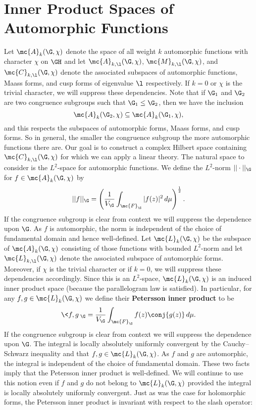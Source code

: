   \section{Inner Product Spaces of Automorphic Functions}
    Let $\mc{A}_{k}(\G,\chi)$ denote the space of all weight $k$ automorphic functions with character $\chi$ on $\GH$ and let $\mc{A}_{k,\l}(\G,\chi)$, $\mc{M}_{k,\l}(\G,\chi)$, and $\mc{C}_{k,\l}(\G,\chi)$ denote the associated subspaces of automorphic functions, Maass forms, and cusp forms of eigenvalue $\l$ respectively. If $k = 0$ or $\chi$ is the trivial character, we will suppress these dependencies. Note that if $\G_{1}$ and $\G_{2}$ are two congruence subgroups such that $\G_{1} \le \G_{2}$, then we have the inclusion
    \[
      \mc{A}_{k}(\G_{2},\chi) \subseteq \mc{A}_{k}(\G_{1},\chi),
    \]
    and this respects the subspaces of automorphic forms, Maass forms, and cusp forms. So in general, the smaller the congruence subgroup the more automorphic functions there are. Our goal is to construct a complex Hilbert space containing $\mc{C}_{k,\l}(\G,\chi)$ for which we can apply a linear theory. The natural space to consider is the $L^{2}$-space for automorphic functions. We define the $L^{2}$-norm $||\cdot||_{\G}$ for $f \in \mc{A}_{k}(\G,\chi)$ by 
    \[
      ||f||_{\G} = \left(\frac{1}{V_{\G}}\int_{\mc{F}_{\G}}|f(z)|^{2}\,d\mu\right)^{\frac{1}{2}}.
    \]
    If the congruence subgroup is clear from context we will suppress the dependence upon $\G$. As $f$ is automorphic, the norm is independent of the choice of fundamental domain and hence well-defined. Let $\mc{L}_{k}(\G,\chi)$ be the subspace of $\mc{A}_{k}(\G,\chi)$ consisting of those functions with bounded $L^{2}$-norm and let $\mc{L}_{k,\l}(\G,\chi)$ denote the associated subspace of automorphic forms. Moreover, if $\chi$ is the trivial character or if $k = 0$, we will suppress these dependencies accordingly. Since this is an $L^{2}$-space, $\mc{L}_{k}(\G,\chi)$ is an induced inner product space (because the parallelogram law is satisfied). In particular, for any $f,g \in \mc{L}_{k}(\G,\chi)$ we define their \textbf{Petersson inner product} to be
    \[
      \<f,g\>_{\G} = \frac{1}{V_{\G}}\int_{\mc{F}_{\G}}f(z)\conj{g(z)}\,d\mu.
    \]
    If the congruence subgroup is clear from context we will suppress the dependence upon $\G$. The integral is locally absolutely uniformly convergent by the Cauchy–Schwarz inequality and that $f,g \in \mc{L}_{k}(\G,\chi)$. As $f$ and $g$ are automorphic, the integral is independent of the choice of fundamental domain. These two facts imply that the Petersson inner product is well-defined. We will continue to use this notion even if $f$ and $g$ do not belong to $\mc{L}_{k}(\G,\chi)$ provided the integral is locally absolutely uniformly convergent. Just as was the case for holomorphic forms, the Petersson inner product is invariant with respect to the slash operator:

